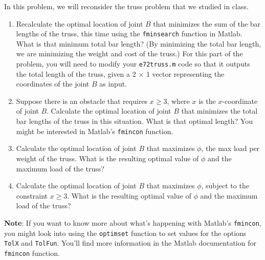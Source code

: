 \documentclass[12pt,letterpaper]{hmcpset}
\begin{document}
	\begin{solution}
		\vfill
	\end{solution}

	\newpage
	
	\begin{problem}[3]
		In this problem, we will reconsider the truss problem that we studied in class.
		\begin{enumerate}
			\item Recalculate the optimal location of joint $B$ that minimizes the sum of the bar lengths of
			the truss, this time using the \texttt{fminsearch} function in Matlab. What is that minimum
			total bar length? (By minimizing the total bar length, we are minimizing the weight and
			cost of the truss.) For this part of the problem, you will need to modify your \texttt{e72truss.m}
			code so that it outputs the total length of the truss, given a 2 $\times$ 1 vector representing the
			coordinates of the joint $B$ as input.
			
			\item Suppose there is an obstacle that requires $x \geq 3$, where $x$ is the $x$-coordinate of joint $B$.
			Calculate the optimal location of joint $B$ that minimizes the total bar lengths of the
			truss in this situation. What is that optimal length? You might be interested in Matlab’s
			\texttt{fmincon} function.
			
			\item Calculate the optimal location of joint $B$ that maximizes $\phi$, the max load per weight of
			the truss. What is the resulting optimal value of $\phi$ and the maximum load of the truss?
			
			\item Calculate the optimal location of joint $B$ that maximizes $\phi$, subject to the constraint
			$x \geq 3$. What is the resulting optimal value of $\phi$ and the maximum load of the truss?
		\end{enumerate}
		\textbf{Note}: If you want to know more about what’s happening with Matlab’s \texttt{fmincon}, you might
		look into using the \texttt{optimset} function to set values for the options \texttt{TolX} and \texttt{TolFun}. You’ll find
		more information in the Matlab documentation for \texttt{fmincon} function.

	\end{problem}
	
\end{document}
